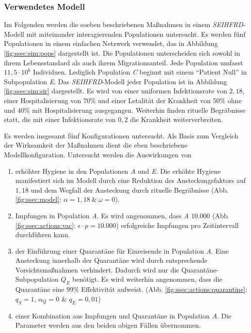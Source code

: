 \subsubsection{Verwendetes Modell}
Im Folgenden werden die soeben beschriebenen Maßnahmen in einem \emph{SEIHFRD}-Modell mit miteinander interagierenden Populationen untersucht. Es werden fünf Populationen in einem einfachen Netzwerk verwendet, das in Abbildung \ref{fig:ssec:sim:pops} dargestellt ist. Die Populationen unterscheiden sich sowohl in ihrem Lebensstandard als auch ihrem Migrationsanteil. Jede Population umfasst $11,5\cdot 10^6$ Individuen. Lediglich Population \emph{C} beginnt mit einem ``Patient Null'' in Subpopulation \emph{E}. Das \emph{SEIHFRD}-Modell jeder Population ist in Abbildung \ref{fig:ssec:sim:sir} dargestellt. Es wird von einer uniformen Infektionsrate von $2,18$, einer Hospitalisierung von $70\%$ und einer Letalität der Krankheit von $50\%$ ohne und $40\%$ mit Hospitalisierung ausgegangen. Weiterhin finden rituelle Begräbnisse statt, die mit einer Infektionsrate von $0,2$ die Krankheit weiterverbreiten.

Es werden insgesamt fünf Konfigurationen untersucht. Als Basis zum Vergleich der Wirksamkeit der Maßnahmen dient die eben beschriebene Modellkonfiguration. Untersucht werden die Auswirkungen von 
\begin{enumerate}
\item erhöhter Hygiene in den Populationen \emph{A} und \emph{E}. Die erhöhte Hygiene manifestiert sich im Modell durch eine Reduktion des Ansteckungsfaktors auf $1,18$ und dem Wegfall der Ansteckung durch rituelle Begräbnisse (Abb. \ref{fig:ssec:model}: $\alpha = 1,18~\&~\omega = 0$).
\item Impfungen in Population \emph{A}. Es wird angenommen, dass \emph{A} $10.000$ (Abb. \ref{fig:ssec:actions:vac}: $\epsilon\cdot p = 10.000$) erfolgreiche Impfungen pro Zeitintervall durchführen kann. 
\item der Einführung einer Quarantäne für Einreisende in Population \emph{A}. Eine Ansteckung innerhalb der Quarantäne wird durch entsprechende Vorsichtsmaßnahmen verhindert. Dadurch wird nur die Quarantäne-Subpopulation $Q_E$ benötigt. Es wird weiterhin angenommen, dass die Quarantäne eine $99\%$ Effektivität aufweist. (Abb. \ref{fig:ssec:actions:quarantine}: $q_S=1$, $\alpha_Q=0$ \& $q_E=0,01$)
\item einer Kombination aus Impfungen und Quarantäne in Population $A$. Die Parameter werden aus den beiden obigen Fällen übernommen.
\end{enumerate}

